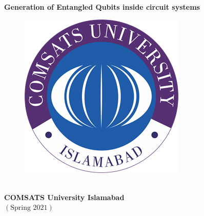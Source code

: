 \documentclass[12pt,two side]{report}
\begin{document}
\begin{titlepage}
\begin{center}
\vspace*{0.3cm}
\textbf{\Huge Generation of Entangled Qubits inside circuit systems} \vspace{0.5cm}
\begin{figure}[H]                                        %
\begin{center}                                           %
\includegraphics[scale=0.6]{comsatslogo.png}             %
\end{center}                                             %
\end{figure}                                             %
\vspace{0.7cm}\\
\vfill
\textbf{\LARGE COMSATS University Islamabad }\\\textbf{$\left( \text{Spring 2021} \right)$}
\newpage
\noindent
\begin{figure}                                             %
\begin{minipage}{0.1\linewidth}                            %
\flushright                                                %

\end{minipage}
\end{figure}
\end{center}
\end{titlepage}
\end{document}
